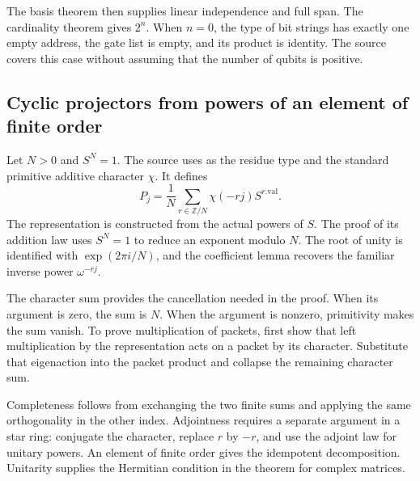 
The basis theorem then supplies linear independence and full span. The cardinality theorem gives $2^n$. When $n=0$, the type of bit strings has exactly one empty address, the gate list is empty, and its product is identity. The source covers this case without assuming that the number of qubits is positive.

\subsection{Cyclic projectors from powers of an element of finite order}
Let $N>0$ and $S^N=1$. The source uses  as the residue type and the standard primitive additive character $\chi$. It defines
\[
P_j=\frac1N\sum_{r\in\mathbb Z/N}\chi(-rj)S^{r.\mathrm{val}}.
\]
The representation  is constructed from the actual powers of $S$. The proof of its addition law uses $S^N=1$ to reduce an exponent modulo $N$. The root of unity is identified with $\exp(2\pi i/N)$, and the coefficient lemma recovers the familiar inverse power $\omega^{-rj}$.


The character sum provides the cancellation needed in the proof. When its argument is zero, the sum is $N$. When the argument is nonzero, primitivity makes the sum vanish. To prove multiplication of packets, first show that left multiplication by the representation acts on a packet by its character. Substitute that eigenaction into the packet product and collapse the remaining character sum.


Completeness follows from exchanging the two finite sums and applying the same orthogonality in the other index. Adjointness requires a separate argument in a star ring: conjugate the character, replace $r$ by $-r$, and use the adjoint law for unitary powers. An element of finite order gives the idempotent decomposition. Unitarity supplies the Hermitian condition in the theorem for complex matrices.



